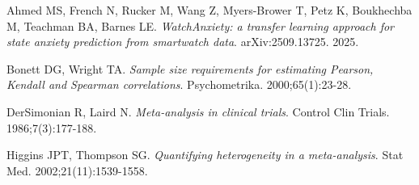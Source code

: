 \documentclass[11pt, a4paper, oneside]{article}
\begin{document}
\begin{thebibliography}{}
Ahmed MS, French N, Rucker M, Wang Z, Myers-Brower T, Petz K, Boukhechba M, Teachman BA, Barnes LE. \textit{WatchAnxiety: a transfer learning approach for state anxiety prediction from smartwatch data}. arXiv:2509.13725. 2025.

Bonett DG, Wright TA. \textit{Sample size requirements for estimating Pearson, Kendall and Spearman correlations}. Psychometrika. 2000;65(1):23-28.

DerSimonian R, Laird N. \textit{Meta-analysis in clinical trials}. Control Clin Trials. 1986;7(3):177-188.

Higgins JPT, Thompson SG. \textit{Quantifying heterogeneity in a meta-analysis}. Stat Med. 2002;21(11):1539-1558.


\end{thebibliography}
\end{document}
